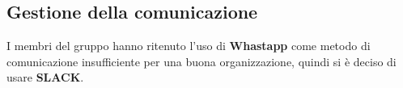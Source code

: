 \subsection{Gestione della comunicazione}
I membri del gruppo hanno ritenuto l'uso di \textbf{Whastapp} come metodo di comunicazione insufficiente per una buona organizzazione, quindi si è deciso di usare \textbf{SLACK}.

\clearpage